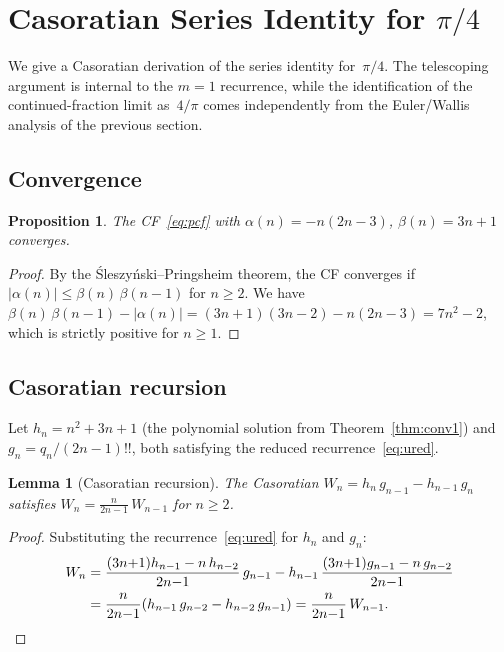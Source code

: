 \documentclass[11pt,a4paper]{article}
\theoremstyle{plain}
\newtheorem{lemma}[theorem]{Lemma}
\newtheorem{proposition}[theorem]{Proposition}
\theoremstyle{definition}
\theoremstyle{remark}
\newcommand{\dff}[1]{(#1)!!}
\begin{document}
\section{Casoratian Series Identity for \texorpdfstring{$\pi/4$}{pi/4}}%
\label{sec:casoratian}

We give a Casoratian derivation of the series identity for~$\pi/4$.
The telescoping argument is internal to the $m=1$ recurrence, while
the identification of the continued-fraction limit as~$4/\pi$ comes
independently from the Euler/Wallis analysis of the previous section.

\subsection{Convergence}

\begin{proposition}\label{prop:conv}
The CF~\eqref{eq:pcf} with
$\alpha(n) = -n(2n{-}3)$, $\beta(n) = 3n{+}1$ converges.
\end{proposition}

\begin{proof}
By the \'Sleszy\'nski--Pringsheim theorem,
the CF converges if
$|\alpha(n)| \leq \beta(n)\,\beta(n{-}1)$ for $n \geq 2$.
We have
$\beta(n)\,\beta(n{-}1) - |\alpha(n)|
= (3n{+}1)(3n{-}2) - n(2n{-}3) = 7n^2 - 2$,
which is strictly positive for $n \geq 1$.
\end{proof}

\subsection{Casoratian recursion}

Let $h_n = n^2{+}3n{+}1$ (the polynomial solution from
Theorem~\ref{thm:conv1}) and $g_n = q_n/\dff{2n{-}1}$,
both satisfying the reduced recurrence~\eqref{eq:ured}.

\begin{lemma}[Casoratian recursion]\label{lem:cas_rec}
The Casoratian $W_n = h_n\,g_{n-1} - h_{n-1}\,g_n$ satisfies
$W_n = \frac{n}{2n{-}1}\,W_{n-1}$ for $n \geq 2$.
\end{lemma}

\begin{proof}
Substituting the recurrence~\eqref{eq:ured} for $h_n$ and $g_n$:
\begin{align*}
  W_n
  &= \frac{(3n{+}1)h_{n-1} - n\,h_{n-2}}{2n{-}1}\,g_{n-1}
    - h_{n-1}\,\frac{(3n{+}1)g_{n-1} - n\,g_{n-2}}{2n{-}1} \\
  &= \frac{n}{2n{-}1}(h_{n-1}\,g_{n-2} - h_{n-2}\,g_{n-1})
   = \frac{n}{2n{-}1}\,W_{n-1}.\qedhere
\end{align*}
\end{proof}
\end{document}
